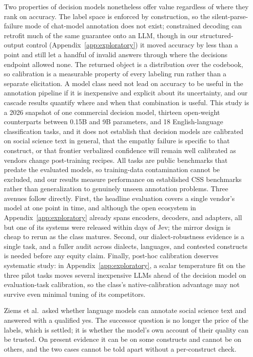 \documentclass[11pt]{article}
\begin{document}
Two properties of decision models nonetheless offer value regardless of where they rank on accuracy. The label space is enforced by construction, so the silent-parse-failure mode of chat-model annotation does not exist; constrained decoding can retrofit much of the same guarantee onto an LLM, though in our structured-output control (Appendix~\ref{app:exploratory}) it moved accuracy by less than a point and still let a handful of invalid answers through where the decisions endpoint allowed none. The returned object is a distribution over the codebook, so calibration is a measurable property of every labeling run rather than a separate elicitation. A model class need not lead on accuracy to be useful in the annotation pipeline if it is inexpensive and explicit about its uncertainty, and our cascade results quantify where and when that combination is useful.
This study is a 2026 snapshot of one commercial decision model, thirteen open-weight counterparts between 0.15B and 9B parameters, and 18 English-language classification tasks, and it does not establish that decision models are calibrated on social science text in general, that the empathy failure is specific to that construct, or that frontier verbalized confidence will remain well calibrated as vendors change post-training recipes. All tasks are public benchmarks that predate the evaluated models, so training-data contamination cannot be excluded, and our results measure performance on established CSS benchmarks rather than generalization to genuinely unseen annotation problems. Three avenues follow directly. First, the headline evaluation covers a single vendor's model at one point in time, and although the open ecosystem in Appendix~\ref{app:exploratory} already spans encoders, decoders, and adapters, all but one of its systems were released within days of Jev; the mirror design is cheap to rerun as the class matures. Second, our dialect-robustness evidence is a single task, and a fuller audit across dialects, languages, and contested constructs is needed before any equity claim. Finally, post-hoc calibration deserves systematic study: in Appendix~\ref{app:exploratory}, a scalar temperature fit on the three pilot tasks moves several inexpensive LLMs ahead of the decision model on evaluation-task calibration, so the class's native-calibration advantage may not survive even minimal tuning of its competitors.

Ziems et al.\ asked whether language models can annotate social science text and answered with a qualified yes. The successor question is no longer the price of the labels, which is settled; it is whether the model's own account of their quality can be trusted. On present evidence it can be on some constructs and cannot be on others, and the two cases cannot be told apart without a per-construct check.
\end{document}
